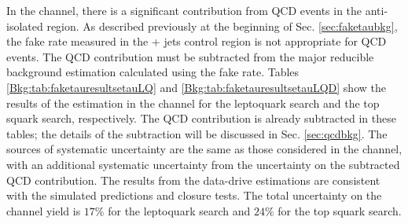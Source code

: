 In the \etau channel, there is a significant contribution from QCD events in the anti-isolated region. As described previously at the beginning of Sec. \ref{sec:faketaubkg}, the fake rate measured in the \Zmm + jets control region is not appropriate for QCD events. The QCD contribution must be subtracted from the major reducible background estimation calculated using the fake rate. Tables \ref{Bkg:tab:faketauresultsetauLQ} and \ref{Bkg:tab:faketauresultsetauLQD} show the results of the estimation in the \etau channel for the leptoquark search and the top squark search, respectively. The QCD contribution is already subtracted in these tables; the details of the subtraction will be discussed in Sec. \ref{sec:qcdbkg}. The sources of systematic uncertainty are the same as those considered in the \mutau channel, with an additional systematic uncertainty from the uncertainty on the subtracted QCD contribution. The results from the data-drive estimations are consistent with the simulated predictions and closure tests. The total uncertainty on the \etau channel yield is $17\%$ for the leptoquark search and $24\%$ for the top squark search.

